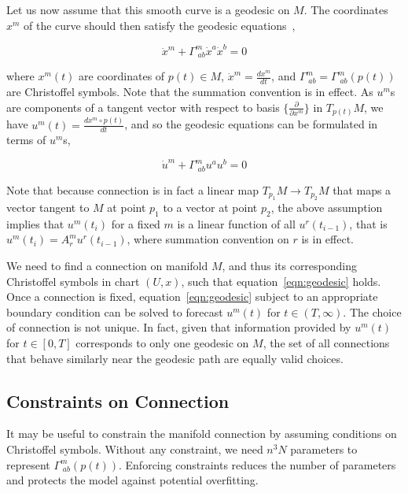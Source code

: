 \documentclass{article}
\begin{document}
Let us now assume that this smooth curve is a
geodesic on $M$. The coordinates $x^{m}$ of the curve should then
satisfy the geodesic equations~\cite{deFelice-1990, schrodinger-1985},

\begin{equation}\label{eqn:geodesic-x}
\ddot{x}^{m} + \Gamma^{m}_{\;ab} \dot{x}^{a} \dot{x}^{b} = 0
\end{equation}

where $x^{m}(t)$ are coordinates of $p(t) \in M$, $\dot{x}^{m} =
\frac{dx^{m}}{dt}$, and $\Gamma^{m}_{\;ab} = \Gamma^{m}_{\;ab}(p(t))$
are Christoffel symbols. Note that the summation convention is in
effect. As $u^{m}$s are components of a tangent vector with respect to
basis $\{\frac{\partial}{\partial{x^{m}}}\}$ in $T_{p(t)}M$, we have
$u^{m}(t) = \frac{dx^{m} \circ p(t)}{dt}$, and so the geodesic
equations can be formulated in terms of $u^{m}$s,

\begin{equation}\label{eqn:geodesic}
\dot{u}^{m} + \Gamma^{m}_{\;ab} u^{a} u^{b} = 0
\end{equation}

Note that because connection is in fact a linear map $T_{p_1}M \to
T_{p_2}M$ that maps a vector tangent to $M$ at point $p_1$ to a vector
at point $p_2$, the above assumption implies that $u^{m}(t_{i})$ for a
fixed $m$ is a linear function of all $u^{r}(t_{i-1})$, that is
$u^{m}(t_{i}) = A^{m}_{r} u^{r}(t_{i-1})$, where summation convention
on $r$ is in effect.

We need to find a connection on manifold $M$, and thus its
corresponding Christoffel symbols in chart $(U,x)$, such that
equation~\ref{eqn:geodesic} holds. Once a connection is fixed,
equation~\ref{eqn:geodesic} subject to an appropriate boundary
condition can be solved to forecast $u^{m}(t)$ for $t \in (T,
\infty)$. The choice of connection is not unique. In fact, given that
information provided by $u^{m}(t)$ for $t \in [0,T]$ corresponds to
only one geodesic on $M$, the set of all connections that behave
similarly near the geodesic path are equally valid choices.

\subsection{Constraints on Connection}
\label{subsection:connection-constraints}

It may be useful to constrain the manifold connection by assuming
conditions on Christoffel symbols. Without any constraint, we need
$n^3 N$ parameters to represent $\Gamma^{m}_{\;ab}(p(t))$. Enforcing
constraints reduces the number of parameters and protects the model
against potential overfitting.
\end{document}
